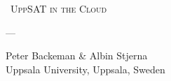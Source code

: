{
	\centering
	\vspace{1cm}
	{\scshape\Huge\ UppSAT in the Cloud \par}
	\vspace{1cm}
	{\scshape\Large --- \par}
	\vspace{0.9cm}
	\begin{center}{Peter Backeman \& Albin Stjerna}\\
	Uppsala University, Uppsala, Sweden
	\end{center}
}